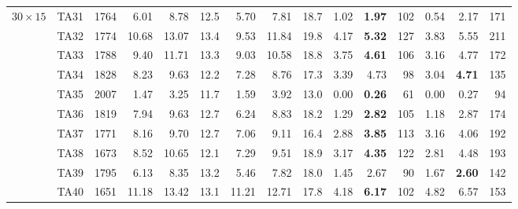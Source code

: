 \documentclass[a4paper,11pt]{article}
\begin{document}
\begin{table}[htbp]
\begin{tabular}{ll r | rr r | rr r | rr r | rr r}
\hline
$30\times15$ & TA31 & 1764 & 6.01 & 8.78 & 12.5 & 5.70 & 7.81 & 18.7 & 1.02 & \textbf{1.97} & 102 & 0.54 & 2.17 & 171 \\
 & TA32 & 1774 & 10.68 & 13.07 & 13.4 & 9.53 & 11.84 & 19.8 & 4.17 & \textbf{5.32} & 127 & 3.83 & 5.55 & 211 \\
 & TA33 & 1788 & 9.40 & 11.71 & 13.3 & 9.03 & 10.58 & 18.8 & 3.75 & \textbf{4.61} & 106 & 3.16 & 4.77 & 172 \\
 & TA34 & 1828 & 8.23 & 9.63 & 12.2 & 7.28 & 8.76 & 17.3 & 3.39 & 4.73 & 98 & 3.04 & \textbf{4.71} & 135 \\
 & TA35 & 2007 & 1.47 & 3.25 & 11.7 & 1.59 & 3.92 & 13.0 & 0.00 & \textbf{0.26} & 61 & 0.00 & 0.27 & 94 \\
 & TA36 & 1819 & 7.94 & 9.63 & 12.7 & 6.24 & 8.83 & 18.2 & 1.29 & \textbf{2.82} & 105 & 1.18 & 2.87 & 174 \\
 & TA37 & 1771 & 8.16 & 9.70 & 12.7 & 7.06 & 9.11 & 16.4 & 2.88 & \textbf{3.85} & 113 & 3.16 & 4.06 & 192 \\
 & TA38 & 1673 & 8.52 & 10.65 & 12.1 & 7.29 & 9.51 & 18.9 & 3.17 & \textbf{4.35} & 122 & 2.81 & 4.48 & 193 \\
 & TA39 & 1795 & 6.13 & 8.35 & 13.2 & 5.46 & 7.82 & 18.0 & 1.45 & 2.67 & 90 & 1.67 & \textbf{2.60} & 142 \\
 & TA40 & 1651 & 11.18 & 13.42 & 13.1 & 11.21 & 12.71 & 17.8 & 4.18 & \textbf{6.17} & 102 & 4.82 & 6.57 & 153 \\
\hline
\end{tabular}
\end{table}

\clearpage
\end{document}
